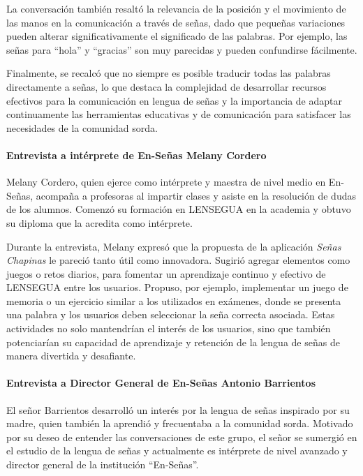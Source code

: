 La conversación también resaltó la relevancia de la posición y el movimiento de las manos en la comunicación a través de señas, dado que pequeñas variaciones pueden alterar significativamente el significado de las palabras. Por ejemplo, las señas para ``hola'' y ``gracias'' son muy parecidas y pueden confundirse fácilmente. 

Finalmente, se recalcó que no siempre es posible traducir todas las palabras directamente a señas, lo que destaca la complejidad de desarrollar recursos efectivos para la comunicación en lengua de señas y la importancia de adaptar continuamente las herramientas educativas y de comunicación para satisfacer las necesidades de la comunidad sorda.


\paragraph{Entrevista a intérprete de En-Señas Melany Cordero}

Melany Cordero, quien ejerce como intérprete y maestra de nivel medio en En-Señas, acompaña a profesoras al impartir clases y asiste en la resolución de dudas de los alumnos. Comenzó su formación en LENSEGUA en la academia y obtuvo su diploma que la acredita como intérprete.

Durante la entrevista, Melany expresó que la propuesta de la aplicación \textit{Señas Chapinas} le pareció tanto útil como innovadora. Sugirió agregar elementos como juegos o retos diarios, para fomentar un aprendizaje continuo y efectivo de LENSEGUA entre los usuarios. Propuso, por ejemplo, implementar un juego de memoria o un ejercicio similar a los utilizados en exámenes, donde se presenta una palabra y los usuarios deben seleccionar la seña correcta asociada. Estas actividades no solo mantendrían el interés de los usuarios, sino que también potenciarían su capacidad de aprendizaje y retención de la lengua de señas de manera divertida y desafiante.


\paragraph{Entrevista a Director General de En-Señas Antonio Barrientos}

El señor Barrientos desarrolló un interés por la lengua de señas inspirado por su madre, quien también la aprendió y frecuentaba a la comunidad sorda. Motivado por su deseo de entender las conversaciones de este grupo, el señor se sumergió en el estudio de la lengua de señas y actualmente es intérprete de nivel avanzado y director general de la institución ``En-Señas''.

